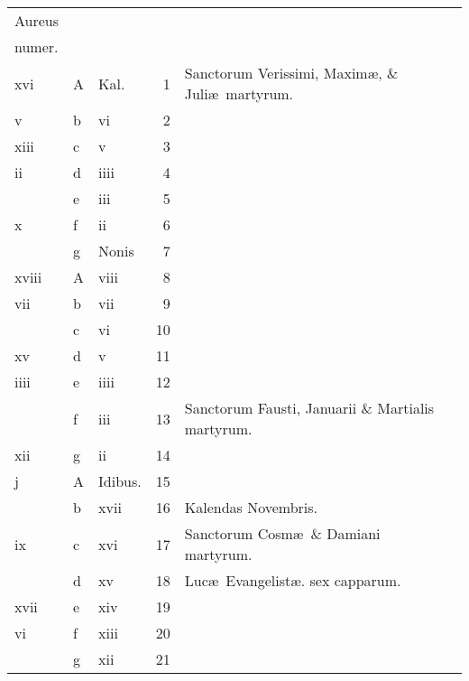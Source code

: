 \documentclass[11pt,openany]{book}
\begin{document}
\begin{center}
\begin{tabular}{l | l | l | r | l r}
\color{Red}Aureus & & & & \color{Red} \\
\color{Red}numer. & & & & \color{Red} \\
\color{Red} xvi & \color{Red} A & \color{Red} Kal. & 1 & Sanctorum Verissimi, Maxim\ae , \& Juli\ae \ martyrum. & \color{Red} \\
\color{Red} v & b & \color{Red} vi & 2 & & \color{Red} \\
\color{Red} xiii & c & \color{Red} v & 3 & & \color{Red} \\
\color{Red} ii & d & \color{Red} iiii & 4 & & \color{Red} \\
\color{Red}  & e & \color{Red} iii & 5 & & \color{Red} \\
\color{Red} x & f & \color{Red} ii & 6 & & \color{Red} \\
\color{Red}  & g & Nonis & 7 & & \color{Red} \\
\color{Red} xviii & \color{Red} A & \color{Red} viii & 8 & & \color{Red} \\
\color{Red} vii & b & \color{Red} vii & 9 & & \color{Red} \\
\color{Red}  & c & \color{Red} vi & 10 & & \color{Red} \\
\color{Red} xv & d & \color{Red} v & 11 & & \color{Red} \\
\color{Red} iiii & e & \color{Red} iiii & 12 & & \color{Red} \\
\color{Red}  & f & \color{Red} iii & 13 & Sanctorum Fausti, Januarii \& Martialis martyrum. & \color{Red} \\
\color{Red} xii & g & \color{Red} ii & 14 & & \color{Red} \\
\color{Red} j & \color{Red} A & Idibus. & 15 & & \color{Red} \\
\color{Red}  & b & \color{Red} xvii & 16 & \qquad \color{Red} Kalendas Novembris. & \color{Red} \\
\color{Red} ix & c & \color{Red} xvi & 17 & Sanctorum Cosm\ae \ \& Damiani martyrum. & \color{Red} \\
\color{Red}  & d & \color{Red} xv & 18 & \color{Red} Luc\ae \ Evangelist\ae . \color{black} sex capparum. & \color{Red} \\
\color{Red} xvii & e & \color{Red} xiv & 19 & & \color{Red} \\
\color{Red} vi & f & \color{Red} xiii & 20 & & \color{Red} \\
\color{Red}  & g & \color{Red} xii & 21 & & \color{Red} \\

\end{tabular}
\end{center}
\end{document}
